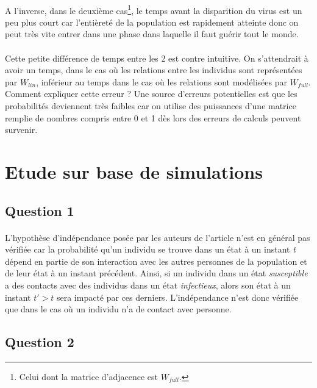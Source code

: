 \documentclass[a4paper, 12pt, oneside]{article}
\begin{document}
\paragraph{}A l'inverse, dans le deuxième cas\footnote{Celui dont la matrice d'adjacence est $W_{full}$.}, le temps avant la disparition du virus est un peu plus court car l'entièreté de la population est rapidement atteinte donc on peut très vite entrer dans une phase dans laquelle il faut guérir tout le monde.
\paragraph{}Cette petite différence de temps entre les 2 est contre intuitive. On s'attendrait à avoir un temps, dans le cas où les relations entre les individus sont représentées par $W_{lin}$, inférieur au temps dans le cas où les relations sont modélisées par $W_{full}$.\\
Comment expliquer cette erreur ? Une source d'erreurs potentielles est que les probabilités deviennent très faibles car on utilise des puissances d'une matrice remplie de nombres compris entre 0 et 1 dès lors des erreurs de calculs peuvent survenir.

\section{Etude sur base de simulations}

\subsection{Question 1}

\paragraph{}L'hypothèse d'indépendance posée par les auteurs de l'article n'est en général pas vérifiée car la probabilité qu'un individu se trouve dans un état à un instant \textit{t} dépend en partie de son interaction avec les autres personnes de la population et de leur état à un instant précédent. Ainsi, si un individu dans un état \textit{susceptible} a des contacts avec des individus dans un état \textit{infectieux}, alors son état à un instant $t' > t$ sera impacté par ces derniers. L'indépendance n'est donc vérifiée que dans le cas où un individu n'a de contact avec personne.

\subsection{Question 2}
\end{document}
